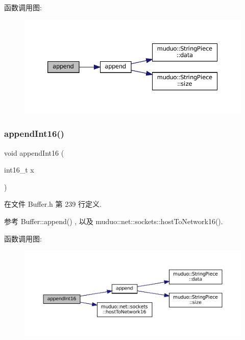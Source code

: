 函数调用图\+:
\nopagebreak
\begin{figure}[H]
\begin{center}
\leavevmode
\includegraphics[width=350pt]{classmuduo_1_1net_1_1Buffer_af4c97664922a815eb9aa9dfe78686007_cgraph}
\end{center}
\end{figure}
\mbox{\label{classmuduo_1_1net_1_1Buffer_a4d4daf38d824d3773fa5d711ffd536e1}} 
\subsubsection{\texorpdfstring{append\+Int16()}{appendInt16()}}
{\footnotesize\ttfamily void append\+Int16 (\begin{DoxyParamCaption}\item[{int16\+\_\+t}]{x }\end{DoxyParamCaption})\hspace{0.3cm}{\ttfamily [inline]}}



在文件 Buffer.\+h 第 239 行定义.



参考 Buffer\+::append() , 以及 muduo\+::net\+::sockets\+::host\+To\+Network16().

函数调用图\+:
\nopagebreak
\begin{figure}[H]
\begin{center}
\leavevmode
\includegraphics[width=350pt]{classmuduo_1_1net_1_1Buffer_a4d4daf38d824d3773fa5d711ffd536e1_cgraph}
\end{center}
\end{figure}
\mbox{\label{classmuduo_1_1net_1_1Buffer_a93760f95378988318124352dbf222e67}} 
